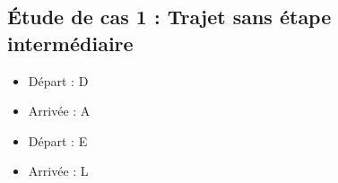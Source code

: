 \documentclass{article}
\begin{document}
\subsection{Étude de cas 1 : Trajet sans étape intermédiaire}
\begin{itemize}
    \item Départ : D
    \item Arrivée : A
\end{itemize}

\begin{itemize}
    \item Départ : E
    \item Arrivée : L
\end{itemize}

\begin{figure}[htbp]
  \centering
  \begin{minipage}[b]{0.45\textwidth}
    \centering

\end{minipage}
\end{figure}
\end{document}
